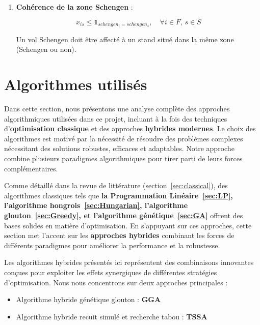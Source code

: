 \begin{enumerate}
	\item \textbf{Cohérence de la zone Schengen} :
\vspace{-0.7em}

\begin{equation}
	x_{is} \leq \mathds{1}_{schengen_i = schengen_s}
	, \quad \forall i \in F,\, s \in S
\end{equation}

	Un vol Schengen doit être affecté à un stand situé dans la même zone (Schengen ou non).
	
\end{enumerate}

\vspace{-1.7em}
\section{Algorithmes utilisés}
\vspace{-0.5em}
Dans cette section, nous présentons une analyse complète des approches algorithmiques utilisées dans ce projet, incluant à la fois des techniques d’\textbf{optimisation classique} et des approches \textbf{hybrides modernes}. Le choix des algorithmes est motivé par la nécessité de résoudre des problèmes complexes nécessitant des solutions robustes, efficaces et adaptables. Notre approche combine plusieurs paradigmes algorithmiques pour tirer parti de leurs forces complémentaires.

Comme détaillé dans la revue de littérature (section~\ref{sec:classical}), des algorithmes classiques tels que \textbf{la Programmation Linéaire~\ref{sec:LP}, l’algorithme hongrois~\ref{sec:Hungarian}, l’algorithme glouton~\ref{sec:Greedy}, et l’algorithme génétique~\ref{sec:GA}} offrent des bases solides en matière d’optimisation. En s’appuyant sur ces approches, cette section met l’accent sur les \textbf{approches hybrides} combinant les forces de différents paradigmes pour améliorer la performance et la robustesse.

Les algorithmes hybrides présentés ici représentent des combinaisons innovantes conçues pour exploiter les effets synergiques de différentes stratégies d’optimisation. Nous nous concentrons sur deux approches principales :

\begin{itemize}
	\item Algorithme hybride génétique glouton  : \textbf{GGA}
	\item Algorithme hybride recuit simulé et recherche tabou : \textbf{TSSA}
\end{itemize}
\vspace{-1.7em}
